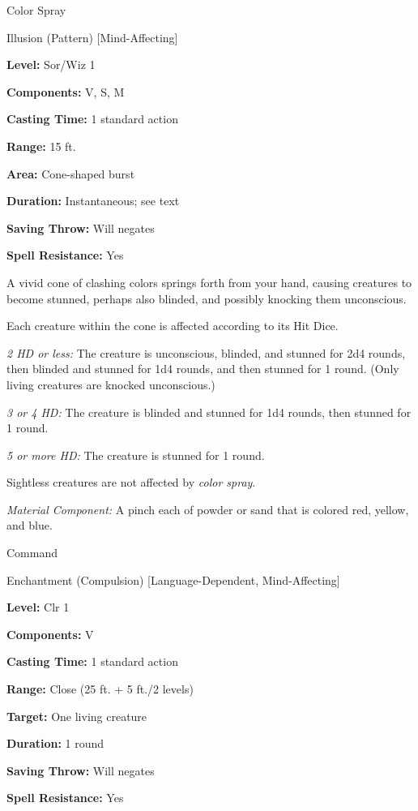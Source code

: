 \documentclass{article}
\begin{document}
\vspace{12pt}
Color Spray

Illusion (Pattern) [Mind-Affecting]

\textbf{Level:} Sor/Wiz 1

\textbf{Components:} V, S, M

\textbf{Casting Time:} 1 standard action

\textbf{Range:} 15 ft.

\textbf{Area:} Cone-shaped burst

\textbf{Duration:} Instantaneous; see text

\textbf{Saving Throw: }Will negates

\textbf{Spell Resistance:} Yes

A vivid cone of clashing colors springs forth from your hand, causing creatures 
to become stunned, perhaps also blinded, and possibly knocking them unconscious.

Each creature within the cone is affected according to its Hit Dice.

\textit{2 HD or less: }The creature is unconscious, blinded, and stunned for 2d4 
rounds, then blinded and stunned for 1d4 rounds, and then stunned for 1 round. 
(Only living creatures are knocked unconscious.)

\textit{3 or 4 HD: }The creature is blinded and stunned for 1d4 rounds, then stunned 
for 1 round.

\textit{5 or more HD: }The creature is stunned for 1 round.

Sightless creatures are not affected by \textit{color spray}.

\textit{Material Component: }A pinch each of powder or sand that is colored red, 
yellow, and blue.

\vspace{12pt}
Command

Enchantment (Compulsion) [Language-Dependent, Mind-Affecting]

\textbf{Level:} Clr 1

\textbf{Components:} V

\textbf{Casting Time:} 1 standard action

\textbf{Range:} Close (25 ft. + 5 ft./2 levels)

\textbf{Target:} One living creature

\textbf{Duration:} 1 round

\textbf{Saving Throw: }Will negates

\textbf{Spell Resistance:} Yes
\end{document}
